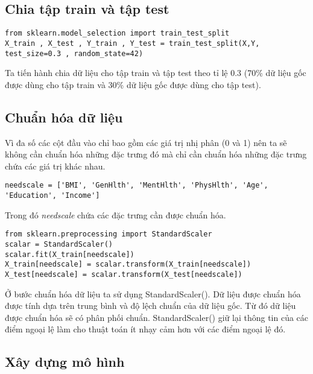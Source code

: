 \documentclass[conference]{IEEEtran}
\begin{document}
\subsection{Chia tập train và tập test}
\begin{lstlisting}
from sklearn.model_selection import train_test_split
X_train , X_test , Y_train , Y_test = train_test_split(X,Y, test_size=0.3 , random_state=42)
\end{lstlisting}
Ta tiến hành chia dữ liệu cho tập train và tập test theo tỉ lệ 0.3 (70\% dữ liệu gốc được dùng cho tập train và 30\% dữ liệu gốc được dùng cho tập test).
\subsection{Chuẩn hóa dữ liệu}
Vì đa số các cột đầu vào chỉ bao gồm các giá trị nhị phân (0 và 1) nên ta sẽ không cần chuẩn hóa những đặc trưng đó mà chỉ cần chuẩn hóa những đặc trưng chứa các giá trị khác nhau.
\begin{lstlisting}
needscale = ['BMI', 'GenHlth', 'MentHlth', 'PhysHlth', 'Age', 'Education', 'Income']
\end{lstlisting}
Trong đó \emph{needscale} chứa các đặc trưng cần được chuẩn hóa.
\begin{lstlisting}
from sklearn.preprocessing import StandardScaler
scalar = StandardScaler()
scalar.fit(X_train[needscale])
X_train[needscale] = scalar.transform(X_train[needscale])
X_test[needscale] = scalar.transform(X_test[needscale])
\end{lstlisting}
Ở bước chuẩn hóa dữ liệu ta sử dụng StandardScaler(). Dữ liệu được chuẩn hóa được tính dựa trên trung bình và độ lệch chuẩn của dữ liệu gốc. Từ đó dữ liệu được chuẩn hóa sẽ có phân phối chuẩn. StandardScaler() giữ lại thông tin của các điểm ngoại lệ làm cho thuật toán ít nhạy cảm hơn với các điểm ngoại lệ đó.
\subsection{Xây dựng mô hình}
\end{document}
